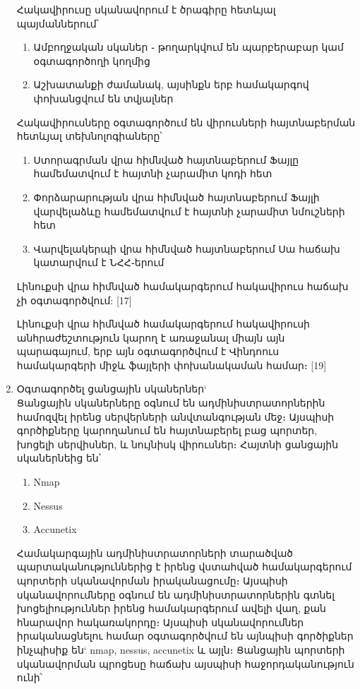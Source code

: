 \documentclass[12pt]{article}
\begin{document}
\begin{sloppypar}
\begin{enumerate}
	Հակավիրուսը սկանավորում է ծրագիրը հետևյալ պայմաններում՝
	\begin{enumerate}
		\item Ամբողջական սկաներ ֊ թողարկվում են պարբերաբար կամ օգտագործողի կողմից
		\item Աշխատանքի ժամանակ, այսինքն երբ համակարգով փոխանցվում են տվյալներ
	\end{enumerate}

	Հակավիրուսները օգտագործում են վիրուսների հայտնաբերման հետևյալ տեխնոլոգիաները՝

	\begin{enumerate}
	\item Ստորագրման վրա հիմնված հայտնաբերում
		Ֆայլը համեմատվում է հայտնի չարամիտ կոդի հետ
	\item Փորձարարության վրա հիմնված հայտնաբերում
		Ֆայլի վարվելաձևը համեմատվում է հայտնի չարամիտ
		նմուշների հետ
	\item Վարվելակերպի վրա հիմնված հայտնաբերում
		Սա հաճախ կատարվում է ՆՀՀ֊երում
	\end{enumerate}

	Լինուքսի վրա հիմնված համակարգերում հակավիրուս հաճախ չի օգտագործվում: [17]

	Լինուքսի վրա հիմնված համակարգերում հակավիրուսի անհրաժեշտություն կարող է
	առաջանալ միայն այն պարագայում, երբ այն օգտագործվում է Վինդոուս համակարգերի
	միջև ֆայլերի փոխանակաման համար։ [19]
\item Օգտագործել ցանցային սկաներներ`\\
    Ցանցային սկաներները օգնում են ադմինիստրատորներին համոզվել իրենց
    սերվերների անվտանգության մեջ։ Այսպիսի գործիքները կարողանում են
    հայտնաբերել բաց պորտեր, խոցելի սերվիսներ, և նույնիսկ վիրուսներ։
    Հայտնի ցանցային սկաներնեից են՝
    \begin{enumerate}
        \item Nmap
        \item Nessus
        \item Accunetix
    \end{enumerate}
	Համակարգային ադմինիստրատորների տարածված պարտականություններից է իրենց
	վստահված համակարգերում պորտերի սկանավորման իրականացումը։
	Այսպիսի սկանավորումները օգնում են ադմինիստրատորներին գտնել խոցելիություններ
	իրենց համակարգերում ավելի վաղ, քան հնարավոր հակառակորդը։
	Այսպիսի սկանավորումներ իրականացնելու համար օգտագործվում են այնպիսի
	գործիքներ ինչպիսիք են` nmap, nessus, accunetix և այլն։
	Ցանցային պորտերի սկանավորման պրոցեսը հաճախ այսպիսի հաջորդականություն ունի՝


\end{enumerate}
\end{sloppypar}
\end{document}
